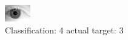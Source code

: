 \begin{figure}[h!]
\begin{center}
\includegraphics[width=0.60\columnwidth]{figures/ID2103_class_4_target_3.png}
\end{center}
\caption{ Classification: 4 actual target: 3}
\label{fig:ID2103_class_4_target_3}
\end{figure}
